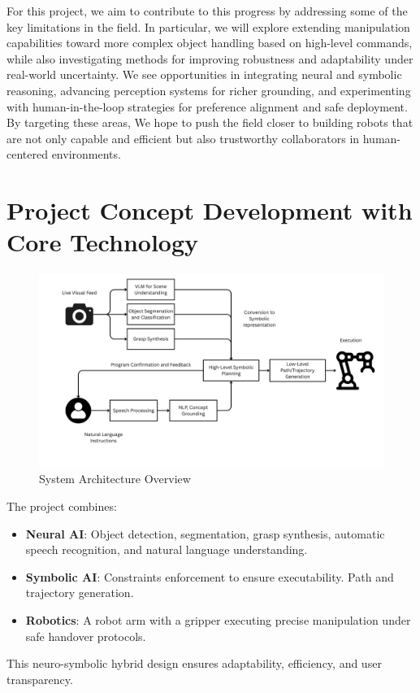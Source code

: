 \documentclass[12pt]{extarticle}
\begin{document}
For this project, we aim to contribute to this progress by addressing some of the key limitations in the field. In particular, we will explore extending manipulation capabilities toward more complex object handling based on high-level commands, while also investigating methods for improving robustness and adaptability under real-world uncertainty. We see opportunities in integrating neural and symbolic reasoning, advancing perception systems for richer grounding, and experimenting with human-in-the-loop strategies for preference alignment and safe deployment. By targeting these areas, We hope to push the field closer to building robots that are not only capable and efficient but also trustworthy collaborators in human-centered environments.

\newpage
\section{Project Concept Development with Core Technology}

\begin{figure}[H]
    \centering
    \includegraphics[width=\linewidth]{images/System_Architecture_Overview.png}
    \caption{System Architecture Overview}
    \label{fig: architecture overview}
\end{figure}

The project combines:
\begin{itemize}
    \item \textbf{Neural AI}: Object detection, segmentation, grasp synthesis, automatic speech recognition, and natural language understanding.
    \item \textbf{Symbolic AI}: Constraints enforcement to ensure executability. Path and trajectory generation.
    \item \textbf{Robotics}: A robot arm with a gripper executing precise manipulation under safe handover protocols. 
\end{itemize}
This neuro-symbolic hybrid design ensures adaptability, efficiency, and user transparency. \\
\end{document}

